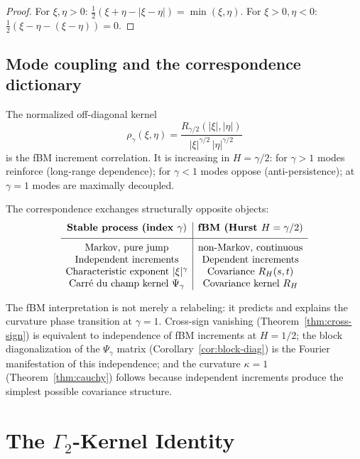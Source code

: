 \documentclass[11pt,a4paper]{article}
\theoremstyle{plain}
\theoremstyle{definition}
\theoremstyle{remark}
\begin{document}
\begin{proof}
For $\xi, \eta > 0$:
$\frac{1}{2}(\xi + \eta - |\xi - \eta|) = \min(\xi, \eta)$.
For $\xi > 0, \eta < 0$:
$\frac{1}{2}(\xi - \eta - (\xi - \eta)) = 0$.
\end{proof}


\subsection{Mode coupling and the correspondence dictionary}

The normalized off-diagonal kernel
\[
  \rho_\gamma(\xi,\eta)
  = \frac{R_{\gamma/2}(|\xi|,|\eta|)}
    {|\xi|^{\gamma/2}\,|\eta|^{\gamma/2}}
\]
is the fBM increment correlation. It is increasing in $H = \gamma/2$:
for $\gamma > 1$ modes reinforce (long-range dependence);
for $\gamma < 1$ modes oppose (anti-persistence);
at $\gamma = 1$ modes are maximally decoupled.

The correspondence exchanges structurally opposite objects:
\[
\begin{array}{c|c}
\textbf{Stable process (index } \gamma\text{)}
& \textbf{fBM (Hurst } H = \gamma/2\text{)} \\[4pt]
\hline
\rule{0pt}{12pt}
\text{Markov, pure jump} & \text{non-Markov, continuous} \\
\text{Independent increments} & \text{Dependent increments} \\
\text{Characteristic exponent } |\xi|^\gamma &
  \text{Covariance } R_H(s,t) \\
\text{Carr\'e du champ kernel } \Psi_\gamma &
  \text{Covariance kernel } R_H
\end{array}
\]

The fBM interpretation is not merely a relabeling: it predicts and
explains the curvature phase transition at $\gamma = 1$.
Cross-sign vanishing (Theorem~\ref{thm:cross-sign}) is equivalent
to independence of fBM increments at $H = 1/2$; the block
diagonalization of the $\Psi_\gamma$ matrix
(Corollary~\ref{cor:block-diag}) is the Fourier manifestation
of this independence; and the curvature $\kappa = 1$
(Theorem~\ref{thm:cauchy}) follows because independent increments
produce the simplest possible covariance structure.


\section{The $\Gamma_2$-Kernel Identity}\label{sec:gamma2}
\end{document}
